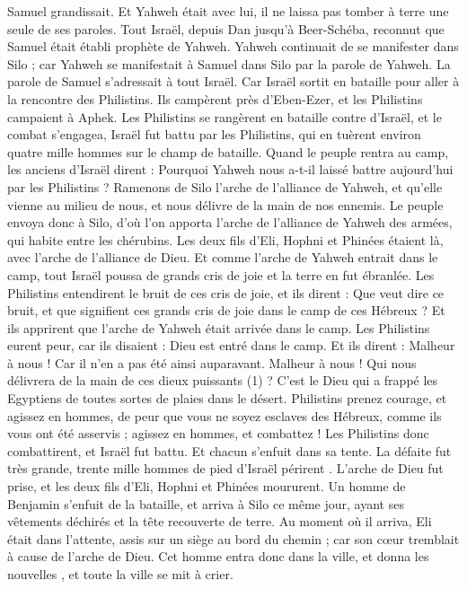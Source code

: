 \begin{multicols}{2}
Samuel grandissait. Et Yahweh était avec lui, il ne laissa pas tomber à terre une seule de ses paroles.
Tout Israël, depuis Dan jusqu'à Beer-Schéba, reconnut que Samuel était établi prophète de Yahweh.
Yahweh continuait de se manifester dans Silo ; car Yahweh se manifestait à Samuel dans Silo par la parole de Yahweh.
\VerseOne{}La parole de Samuel s’adressait à tout Israël. Car Israël sortit en bataille pour aller à la rencontre des Philistins. Ils campèrent près d'Eben-Ezer, et les Philistins campaient à Aphek.
Les Philistins se rangèrent en bataille contre d'Israël, et le combat s’engagea, Israël fut battu par les Philistins, qui en tuèrent environ quatre mille hommes sur le champ de bataille.
Quand le peuple rentra au camp, les anciens d'Israël dirent : Pourquoi Yahweh nous a-t-il laissé battre aujourd'hui par les Philistins ? Ramenons de Silo l'arche de l'alliance de Yahweh, et qu'elle vienne au milieu de nous, et nous délivre de la main de nos ennemis.
Le peuple envoya donc à Silo, d’où l’on apporta l'arche de l'alliance de Yahweh des armées, qui habite entre les chérubins. Les deux fils d’Eli, Hophni et Phinées étaient là, avec l'arche de l'alliance de Dieu.
Et comme l'arche de Yahweh entrait dans le camp, tout Israël poussa de grands cris de joie et la terre en fut ébranlée.
Les Philistins entendirent le bruit de ces cris de joie, et ils dirent : Que veut dire ce bruit, et que signifient ces grands cris de joie dans le camp de ces Hébreux ? Et ils apprirent que l'arche de Yahweh était arrivée dans le camp.
Les Philistins eurent peur, car ils disaient : Dieu est entré dans le camp. Et ils dirent : Malheur à nous ! Car il n’en a pas été ainsi auparavant.
Malheur à nous ! Qui nous délivrera de la main de ces dieux puissants (1) ? C’est le Dieu qui a frappé les Egyptiens de toutes sortes de plaies dans le désert.
Philistins prenez courage, et agissez en hommes, de peur que vous ne soyez esclaves des Hébreux, comme ils vous ont été asservis ; agissez en hommes, et combattez !
Les Philistins donc combattirent, et Israël fut battu. Et chacun s’enfuit dans sa tente. La défaite fut très grande, trente mille hommes de pied d'Israël périrent .
L'arche de Dieu fut prise, et les deux fils d'Eli, Hophni et Phinées moururent.
Un homme de Benjamin s'enfuit de la bataille, et arriva à Silo ce même jour, ayant ses vêtements déchirés et la tête recouverte de terre.
Au moment où il arriva, Eli était dans l’attente, assis sur un siège au bord du chemin ; car son cœur tremblait à cause de l'arche de Dieu. Cet homme entra donc dans la ville, et donna les nouvelles , et toute la ville se mit à crier.

\end{multicols}
